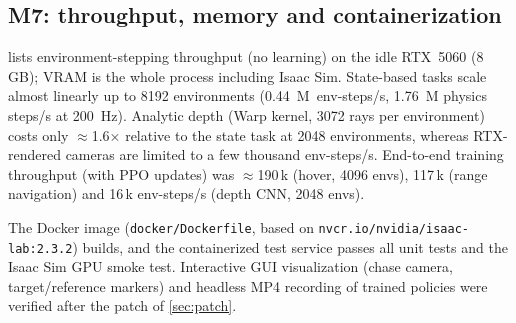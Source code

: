 \documentclass[11pt,a4paper]{article}
\begin{document}
\subsection{M7: throughput, memory and containerization}
 lists environment-stepping throughput (no learning) on the idle RTX~5060 (8\,GB); VRAM is the whole
process including Isaac Sim. State-based tasks scale almost linearly up to 8192 environments
(\SI{0.44}{M}~env-steps/s, \SI{1.76}{M} physics steps/s at \SI{200}{Hz}). Analytic depth (Warp kernel, 3072 rays per
environment) costs only $\approx$1.6$\times$ relative to the state task at 2048 environments, whereas RTX-rendered
cameras are limited to a few thousand env-steps/s. End-to-end training throughput (with PPO updates) was
$\approx$190\,k (hover, 4096 envs), 117\,k (range navigation) and 16\,k env-steps/s (depth CNN, 2048 envs).
\begin{table}[h]\centering\small

\caption{Environment throughput and process VRAM (\texttt{scripts/tools/benchmark.py}).}
\label{tab:bench}
\end{table}
The Docker image (\texttt{docker/Dockerfile}, based on \texttt{nvcr.io/nvidia/isaac-lab:2.3.2}) builds, and the
containerized test service passes all unit tests and the Isaac Sim GPU smoke test. Interactive GUI visualization (chase
camera, target/reference markers) and headless MP4 recording of trained policies were verified after the patch of
\cref{sec:patch}.






\end{document}
